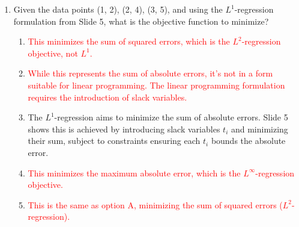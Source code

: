 \documentclass{article}%
\newcommand{\incorrect}[1]{\textcolor{red}{#1}}
\begin{document}
\begin{enumerate}
\begin{enumerate}
\item \incorrect{While this is true in simple cases, it's not the complete geometric interpretation.}%
\item \incorrect{While often true, it's not always the case for $L^1$ solutions.}%
\item \incorrect{Neither solution is guaranteed to be unique in all cases.}%
\end{enumerate}%
\vspace{1em}%
\item Given the data points (1, 2), (2, 4), (3, 5), and using the $L^1$-regression formulation from Slide 5, what is the objective function to minimize?%
\begin{enumerate}%
\item \incorrect{This minimizes the sum of squared errors, which is the $L^2$-regression objective, not $L^1$.}%
\item \incorrect{While this represents the sum of absolute errors, it's not in a form suitable for linear programming. The linear programming formulation requires the introduction of slack variables.}%
\item The $L^1$-regression aims to minimize the sum of absolute errors.  Slide 5 shows this is achieved by introducing slack variables $t_i$ and minimizing their sum, subject to constraints ensuring each $t_i$ bounds the absolute error.%
\item \incorrect{This minimizes the maximum absolute error, which is the $L^\infty$-regression objective.}%
\item \incorrect{This is the same as option A, minimizing the sum of squared errors ($L^2$-regression).}%
\end{enumerate}%
\vspace{1em}%
\end{enumerate}

%
\end{document}
